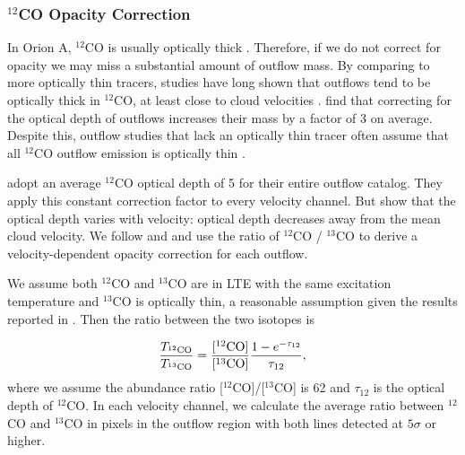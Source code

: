 \documentclass[twocolumn]{aastex63}
\newcommand{\co}[1][]{\ensuremath{^{#1}}CO}
\begin{document}
\subsubsection{$^{12}$CO Opacity Correction}\label{sec:opacity}
In Orion A, \co[12]{} is usually optically thick \citep{Kong18}. Therefore, if we do not correct for opacity we may miss a substantial amount of outflow mass. By comparing to more optically thin tracers, studies have long shown that outflows tend to be optically thick in \co[12]{}, at least close to cloud velocities \citep[e.g.,][]{Goldsmith84,Arce01}. \citet{Dunham14} find that correcting for the optical depth of outflows increases their mass by a factor of 3 on average. Despite this, outflow studies that lack an optically thin tracer often assume that all \co[12]{} outflow emission is optically thin \citep[e.g. in Orion,][]{Morgan91,Takahashi08}. 

\citet{Tanabe19} adopt an average \co[12]{} optical depth of 5 for their entire outflow catalog. They apply this constant correction factor to every velocity channel. But \citet{Dunham14} show that the optical depth varies with velocity: optical depth decreases away from the mean cloud velocity. We follow \citet{Dunham14} and \citet{ZhangY16} and use the ratio of $^{12}$CO / $^{13}$CO to derive a velocity-dependent opacity correction for each outflow.

We assume both \co[12]{} and \co[13]{} are in LTE with the same excitation temperature and \co[13]{} is optically thin, a reasonable assumption given the results reported in \citet{Kong18}. Then the ratio between the two isotopes is

\begin{equation}\label{eq:Tratio}
\frac{T_{\rm \co[12]}}{T_{\rm \co[13]}} = \frac{[\rm{\co[12]}]}{[\rm{\co[13]}]} \frac{1 - e^{-\tau_{12}}}{\tau_{12}},
\end{equation}
where we assume the abundance ratio [\co[12]]/[\co[13]] is 62 \citep{Langer93} and $\tau_{12}$ is the optical depth of \co[12]{}. In each velocity channel, we calculate the average ratio between \co[12]{} and \co[13]{} in pixels in the outflow region with both lines detected at $5\sigma$ or higher. 
\end{document}

